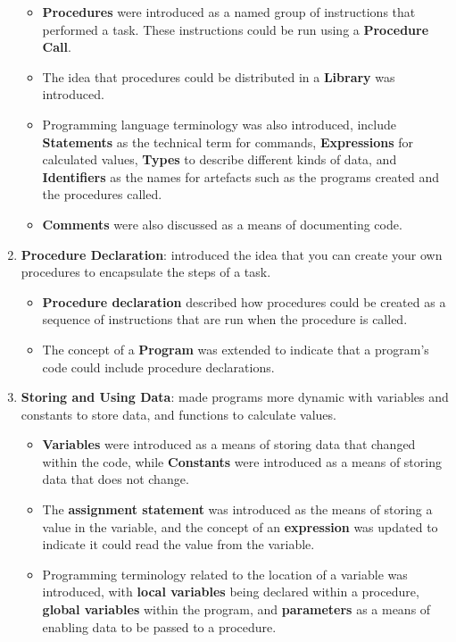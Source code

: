 \begin{enumerate}
\begin{itemize}[noitemsep,nolistsep]
    \item \textbf{Procedures} were introduced as a named group of instructions that performed a task. These instructions could be run using a \textbf{Procedure Call}.
    \item The idea that procedures could be distributed in a \textbf{Library} was introduced.
    \item Programming language terminology was also introduced, include \textbf{Statements} as the technical term for commands, \textbf{Expressions} for calculated values, \textbf{Types} to describe different kinds of data, and \textbf{Identifiers} as the names for artefacts such as the programs created and the procedures called. 
    \item \textbf{Comments} were also discussed as a means of documenting code.
  \end{itemize}
  \item \textbf{Procedure Declaration}: introduced the idea that you can create your own procedures to encapsulate the steps of a task. 
  \begin{itemize}[noitemsep,nolistsep]
     \item \textbf{Procedure declaration} described how procedures could be created as a sequence of instructions that are run when the procedure is called.
     \item The concept of a \textbf{Program} was extended to indicate that a program's code could include procedure declarations.
   \end{itemize} 
  \item \textbf{Storing and Using Data}: made programs more dynamic with variables and constants to store data, and functions to calculate values.
  \begin{itemize}[noitemsep,nolistsep]
    \item \textbf{Variables} were introduced as a means of storing data that changed within the code, while \textbf{Constants} were introduced as a means of storing data that does not change. 
    \item The \textbf{assignment statement} was introduced as the means of storing a value in the variable, and the concept of an \textbf{expression} was updated to indicate it could read the value from the variable.
    \item Programming terminology related to the location of a variable was introduced, with \textbf{local variables} being declared within a procedure, \textbf{global variables} within the program, and \textbf{parameters} as a means of enabling data to be passed to a procedure.

\end{itemize}
\end{enumerate}
